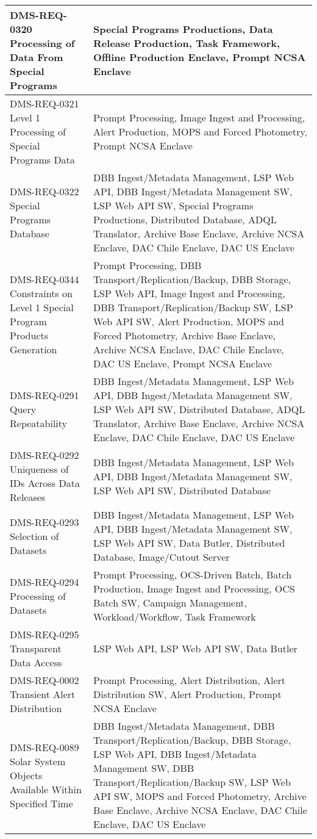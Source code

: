 \begin{xtabular}{p{0.4\textwidth}p{0.55\textwidth}}
DMS-REQ-0320 Processing of Data From Special Programs & Special Programs Productions, Data Release Production, Task Framework, Offline Production Enclave, Prompt NCSA Enclave \\ \hline
DMS-REQ-0321 Level 1 Processing of Special Programs Data & Prompt Processing, Image Ingest and Processing, Alert Production, MOPS and Forced Photometry, Prompt NCSA Enclave \\ \hline
DMS-REQ-0322 Special Programs Database & DBB Ingest/Metadata Management, LSP Web API, DBB Ingest/Metadata Management SW, LSP Web API SW, Special Programs Productions, Distributed Database, ADQL Translator, Archive Base Enclave, Archive NCSA Enclave, DAC Chile Enclave, DAC US Enclave \\ \hline
DMS-REQ-0344 Constraints on Level 1 Special Program Products Generation & Prompt Processing, DBB Transport/Replication/Backup, DBB Storage, LSP Web API, Image Ingest and Processing, DBB Transport/Replication/Backup SW, LSP Web API SW, Alert Production, MOPS and Forced Photometry, Archive Base Enclave, Archive NCSA Enclave, DAC Chile Enclave, DAC US Enclave, Prompt NCSA Enclave \\ \hline
DMS-REQ-0291 Query Repeatability & DBB Ingest/Metadata Management, LSP Web API, DBB Ingest/Metadata Management SW, LSP Web API SW, Distributed Database, ADQL Translator, Archive Base Enclave, Archive NCSA Enclave, DAC Chile Enclave, DAC US Enclave \\ \hline
DMS-REQ-0292 Uniqueness of IDs Across Data Releases & DBB Ingest/Metadata Management, LSP Web API, DBB Ingest/Metadata Management SW, LSP Web API SW, Distributed Database \\ \hline
DMS-REQ-0293 Selection of Datasets & DBB Ingest/Metadata Management, LSP Web API, DBB Ingest/Metadata Management SW, LSP Web API SW, Data Butler, Distributed Database, Image/Cutout Server \\ \hline
DMS-REQ-0294 Processing of Datasets & Prompt Processing, OCS-Driven Batch, Batch Production, Image Ingest and Processing, OCS Batch SW, Campaign Management, Workload/Workflow, Task Framework \\ \hline
DMS-REQ-0295 Transparent Data Access & LSP Web API, LSP Web API SW, Data Butler \\ \hline
DMS-REQ-0002 Transient Alert Distribution & Prompt Processing, Alert Distribution, Alert Distribution SW, Alert Production, Prompt NCSA Enclave \\ \hline
DMS-REQ-0089 Solar System Objects Available Within Specified Time & DBB Ingest/Metadata Management, DBB Transport/Replication/Backup, DBB Storage, LSP Web API, DBB Ingest/Metadata Management SW, DBB Transport/Replication/Backup SW, LSP Web API SW, MOPS and Forced Photometry, Archive Base Enclave, Archive NCSA Enclave, DAC Chile Enclave, DAC US Enclave \\ \hline

\end{xtabular}
